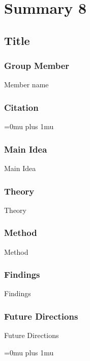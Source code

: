 \section{Summary 8}

\noindent
\subsection{Title}

\subsubsection{Group Member}

\noindent
Member name

\noindent
\subsubsection{Citation}

\Urlmuskip=0mu plus 1mu\relax

\subsubsection{Main Idea}

\noindent
Main Idea

\subsubsection{Theory}

\noindent
Theory

\subsubsection{Method}

\noindent
Method

\subsubsection{Findings}

\noindent
Findings

\subsubsection{Future Directions}

\noindent
Future Directions 

\Urlmuskip=0mu plus 1mu\relax

\pagebreak